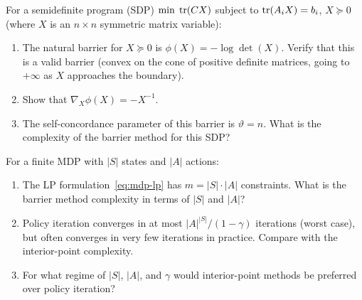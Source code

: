 \documentclass[11pt,a4paper]{article}
\begin{document}
\begin{exercise}\label{ex:sdp-barrier}
For a semidefinite program (SDP) $\min\; \operatorname{tr}(CX)$ subject to
$\operatorname{tr}(A_i X) = b_i$, $X \succeq 0$ (where $X$ is an $n \times n$
symmetric matrix variable):
\begin{enumerate}[label=(\alph*)]
  \item The natural barrier for $X \succeq 0$ is
    $\phi(X) = -\log\det(X)$. Verify that this is a valid barrier
    (convex on the cone of positive definite matrices, going to
    $+\infty$ as $X$ approaches the boundary).
  \item Show that $\nabla_X \phi(X) = -X^{-1}$.
  \item The self-concordance parameter of this barrier is $\vartheta = n$.
    What is the complexity of the barrier method for this SDP?
\end{enumerate}
\end{exercise}

\begin{exercise}\label{ex:ip-vs-pi}
For a finite MDP with $|S|$ states and $|A|$ actions:
\begin{enumerate}[label=(\alph*)]
  \item The LP formulation~\eqref{eq:mdp-lp} has $m = |S| \cdot |A|$
    constraints. What is the barrier method complexity in terms of
    $|S|$ and $|A|$?
  \item Policy iteration converges in at most
    $|A|^{|S|}/(1 - \gamma)$ iterations (worst case), but often
    converges in very few iterations in practice. Compare with the
    interior-point complexity.
  \item For what regime of $|S|$, $|A|$, and $\gamma$ would
    interior-point methods be preferred over policy iteration?
\end{enumerate}
\end{exercise}


\end{document}
